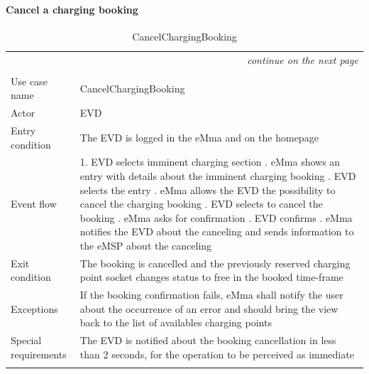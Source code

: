 \paragraph{Cancel a charging booking}
\begin{center}
    \begin{longtable}{p{4cm} p{11cm}}
    \multicolumn{2}{r}{\itshape{continue on the next page}}\\
    \endfoot 
    \\
    \endlastfoot
    \hline
     Use case name &  CancelChargingBooking\\
     \hline
     Actor & EVD \\
     \hline
     Entry condition &   The EVD is logged in the eMma and on the homepage\\
     \hline
     Event flow &
        1. EVD selects imminent charging section \newline
        2. eMma shows an entry with details about the imminent charging booking \newline
        3. EVD selects the entry \newline
        4. eMma allows the EVD the possibility to cancel the charging booking \newline
        5. EVD selects to cancel the booking \newline
        6. eMma asks for confirmation \newline
        7. EVD confirms \newline
        8. eMma notifies the EVD about the canceling and sends information to the eMSP about the canceling\\
     \hline
     Exit condition &  The booking is cancelled and the previously reserved charging point socket changes status to free in the booked time-frame\\
     \hline
     Exceptions &
        If the booking confirmation fails, eMma shall notify the user about the occurrence of an error and should bring the view back to the list of availables charging points
     \\
     \hline
     Special requirements & 
        The EVD is notified about the booking cancellation in less than 2 seconds, for the operation to be perceived as immediate\\
     \hline
    \caption{CancelChargingBooking}
    \label{tab:CancelChargingBooking}
    \end{longtable}
\end{center}

